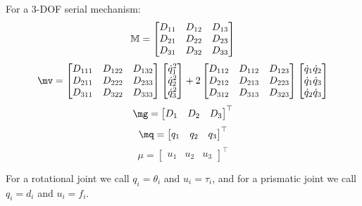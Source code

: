 \documentclass[a4paper,11pt,brazil,fleqn]{article}
\begin{document}
For a 3-DOF serial mechanism:
\begin{equation}
\mathbb{M} = 
\begin{bmatrix}
D_{11} & D_{12} & D_{13} \\
D_{21} & D_{22} & D_{23} \\
D_{31} & D_{32} & D_{33} \\
\end{bmatrix}
\end{equation}
\begin{equation}
\mv = 
\begin{bmatrix}
D_{111} & D_{122} & D_{132} \\
D_{211} & D_{222} & D_{233} \\
D_{311} & D_{322} & D_{333} \\
\end{bmatrix}
\begin{bmatrix}
\dot{q}_1^2 \\
\dot{q}_2^2 \\
\dot{q}_3^2 \\
\end{bmatrix}
+
2\begin{bmatrix}
D_{112} & D_{112} & D_{123} \\
D_{212} & D_{213} & D_{223} \\
D_{312} & D_{313} & D_{323} \\
\end{bmatrix}
\begin{bmatrix}
\dot{q}_1 \dot{q}_2 \\
\dot{q}_1 \dot{q}_3 \\
\dot{q}_2 \dot{q}_3 \\
\end{bmatrix}
\end{equation}
\begin{equation}
\mg =
\begin{bmatrix}
D_1 &
D_2 &
D_3
\end{bmatrix}^\top
\end{equation}
\begin{equation}
\mq =
\begin{bmatrix}
q_1 &
q_2 &
q_3
\end{bmatrix}^\top
\end{equation}
\begin{equation}
\mu =
\begin{bmatrix}
u_1 &
u_2 &
u_3
\end{bmatrix}^\top
\end{equation}

For a rotational joint we call $q_i = \theta_i$ and $u_i = \tau_i$, and for a prismatic joint we call $q_i = d_i$ and $u_i = f_i$.
\end{document}
